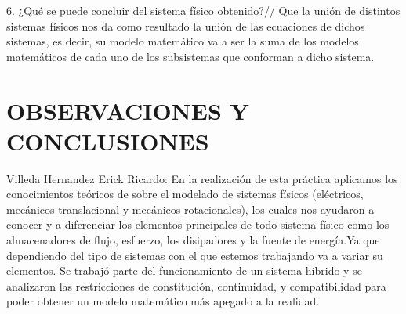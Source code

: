 6. ¿Qué se puede concluir del sistema físico obtenido?//
Que la unión de distintos sistemas físicos nos da como resultado la unión de las ecuaciones de dichos sistemas, es decir, su modelo matemático va a ser la suma de los modelos matemáticos de cada uno de los subsistemas que conforman a dicho sistema.

\section{OBSERVACIONES Y CONCLUSIONES}

	Villeda Hernandez Erick Ricardo: En la realización de esta práctica aplicamos los conocimientos teóricos de sobre el modelado de sistemas físicos (eléctricos, mecánicos translacional y mecánicos rotacionales), los cuales nos ayudaron a conocer y a diferenciar los elementos principales de todo sistema físico como los almacenadores de flujo, esfuerzo, los disipadores y la fuente de energía.Ya que dependiendo del tipo de sistemas con el que estemos trabajando va a variar su elementos. Se trabajó parte del funcionamiento de un sistema híbrido y se analizaron  las restricciones de constitución, continuidad, y compatibilidad para poder obtener un modelo matemático más apegado a la realidad.
